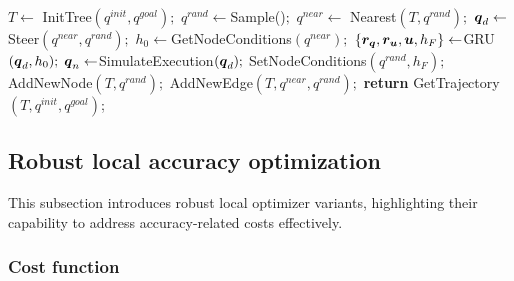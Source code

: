 \begin{algorithm}[htp]
\caption{ [$q^{init}, q^{goal}$]}\label{alg:ExtensionExample}
\begin{algorithmic}[1]
\State $T \gets$ InitTree$({q^{init}, q^{goal}});$
    \State ${q^{rand}} \gets $Sample()$;$
    \State ${q^{near}} \gets$ Nearest$(T,{q^{rand}});$
    \State $\boldsymbol{q}_d \gets$ Steer$({q^{near}},{q^{rand}});$
    \State $h_{0} \gets $GetNodeConditions$({q^{near}});$
    \State $\left \{\boldsymbol{r_q},\boldsymbol{r_u},\boldsymbol{u}, h_{F} \right \} \gets $GRU$(\boldsymbol{q}_d,h_{0});$
        \State $\boldsymbol{q}_{n} \gets $SimulateExecution$(\boldsymbol{q}_d);$
                \State SetNodeConditions$({q^{rand}}, h_{F});$
                \State AddNewNode$(T, {q^{rand}});$
                \State AddNewEdge$(T, {q^{near}}, {q^{rand}});$
        \EndIf
    \EndIf
\EndWhile
\State \textbf{return} GetTrajectory$(T, q^{init}, q^{goal})$;
\end{algorithmic}
\end{algorithm}

\subsection{Robust local accuracy optimization}\label{sec:AOptim}

This subsection introduces robust local optimizer variants, highlighting their capability to address accuracy-related costs effectively.

\subsubsection{Cost function}\label{sec:AOptimCost}

